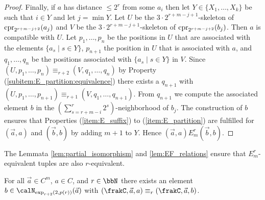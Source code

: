 \begin{proof}
	
	Finally, if $a$ has distance $\leq 2^{r}$ from some $a_i$ then let $Y\in \{X_1,\ldots,X_k\}$ be such that $i\in Y$ and let $j=\min Y$. Let $U$ be the $3\cdot 2^{r+m-j+1}$-skeleton of $\operatorname{cpr}_{2^{r+m-j+2}}(a_j)$ and 
	$V$ be the $3\cdot 2^{r+m-j+1}$-skeleton of $\operatorname{cpr}_{2^{r+m-j+2}}(b_j)$.
	Then $a$ is compatible with $U$. Let $p_1,\ldots,p_n$ be the positions in $U$ that are associated with the elements $\{a_s \mid s\in Y\}$, $p_{n+1}$ the position in $U$ that is associated with $a$, and $q_1,\ldots,q_n$ be the positions associated with  $\{a_s \mid s\in Y\}$ in $V$. Since $(U,p_1,\ldots,p_n) \equiv_{r+2} (V,q_1,\ldots,q_n)$ by Property (\ref{subitem:E_partition:equivalence}) there exists a $q_{n+1}$ with $(U,p_1,\ldots,p_{n+1}) \equiv_{r+1} (V,q_1,\ldots,q_{n+1})$. From $q_{n+1}$ we compute the associated element $b$
	in the  $(\sum_{s= r+m-i}^{r} 2^s)$-neighborhood of $b_j$.	
	The construction of $b$ ensures that Properties (\ref{item:E_suffix}) to (\ref{item:E_partition}) are fulfilled for $(\vec{a}, a)$ and $(\vec{b}, b)$ by adding $m+1$ to $Y$. Hence $(\vec{a}, a) E^r_m (\vec{b}, b)$.   
\end{proof}

The Lemmata \ref{lem:partial_isomorphism} and \ref{lem:EF_relations} ensure that $E^r_m$-equivalent tuples are also $r$-equivalent.

\begin{corollary}\label{cor:equivalence}
	For all $\vec{a}\in C^m$, $a\in C$, and $r\in\bbN$ there exists an element $b\in \calN_{\exp_{r+2}(2,p(r))}(\vec{a})$ with $(\frakC, \vec{a}, a) \equiv_r (\frakC,\vec{a}, b)$.
\end{corollary}


